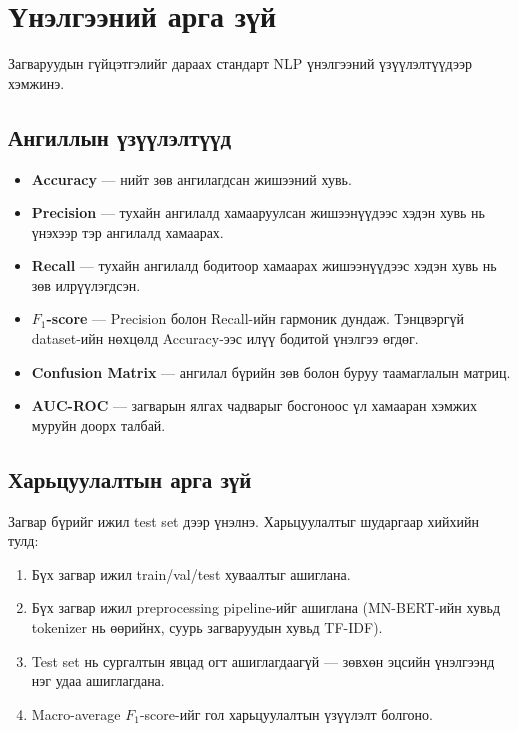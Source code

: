 \section{Үнэлгээний арга зүй}

Загваруудын гүйцэтгэлийг дараах стандарт NLP үнэлгээний үзүүлэлтүүдээр хэмжинэ.

\subsection{Ангиллын үзүүлэлтүүд}

\begin{itemize}
  \item \textbf{Accuracy} --- нийт зөв ангилагдсан жишээний хувь.
  \item \textbf{Precision} --- тухайн ангилалд хамааруулсан жишээнүүдээс хэдэн
        хувь нь үнэхээр тэр ангилалд хамаарах.
  \item \textbf{Recall} --- тухайн ангилалд бодитоор хамаарах жишээнүүдээс хэдэн
        хувь нь зөв илрүүлэгдсэн.
  \item \textbf{$F_1$-score} --- Precision болон Recall-ийн гармоник дундаж.
        Тэнцвэргүй dataset-ийн нөхцөлд Accuracy-ээс илүү бодитой үнэлгээ өгдөг.
  \item \textbf{Confusion Matrix} --- ангилал бүрийн зөв болон буруу
        таамаглалын матриц.
  \item \textbf{AUC-ROC} --- загварын ялгах чадварыг босгоноос үл хамааран
        хэмжих муруйн доорх талбай.
\end{itemize}

\subsection{Харьцуулалтын арга зүй}

Загвар бүрийг ижил test set дээр үнэлнэ. Харьцуулалтыг шударгаар хийхийн тулд:
\begin{enumerate}
  \item Бүх загвар ижил train/val/test хуваалтыг ашиглана.
  \item Бүх загвар ижил preprocessing pipeline-ийг ашиглана (MN-BERT-ийн хувьд
        tokenizer нь өөрийнх, суурь загваруудын хувьд TF-IDF).
  \item Test set нь сургалтын явцад огт ашиглагдаагүй --- зөвхөн эцсийн
        үнэлгээнд нэг удаа ашиглагдана.
  \item Macro-average $F_1$-score-ийг гол харьцуулалтын үзүүлэлт болгоно.
\end{enumerate}

